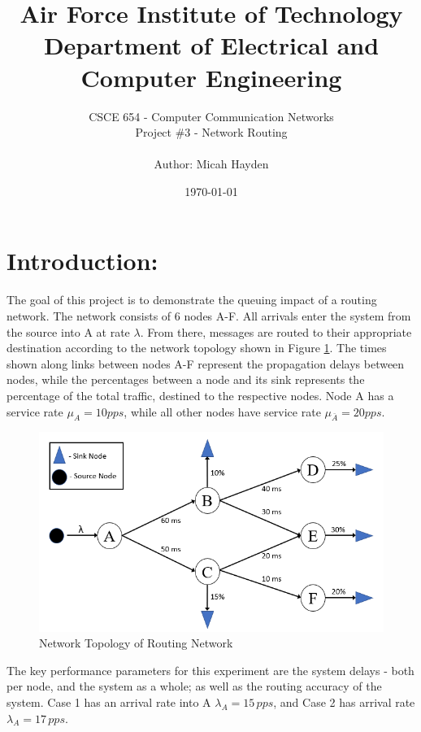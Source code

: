 \documentclass{article}
\title{Air Force Institute of Technology \\ Department of Electrical and Computer Engineering}
\author{CSCE 654 - Computer Communication Networks \\ Project \#3 - Network Routing \\ \\ Author:  Micah Hayden }
\date{\today}
\begin{document}
\maketitle

\section{Introduction:}
\label{sec:Intro}

The goal of this project is to demonstrate the queuing impact of a routing network.
The network consists of 6 nodes A-F. 
All arrivals enter the system from the source into A at rate $\lambda$.
From there, messages are routed to their appropriate destination according to the network topology shown in Figure \ref{fig:Topology}.
The times shown along links between nodes A-F represent the propagation delays between nodes, while the percentages between a node and its sink represents the percentage of the total traffic, destined to the respective nodes. 
Node A has a service rate $\mu_A = 10 pps$, while all other nodes have service rate $\mu_{\bar{A}} = 20 pps$.

\begin{figure}[h!]
\centering
\includegraphics[scale=0.75]{Images/NetworkTopology.PNG}
\caption{Network Topology of Routing Network}
\label{fig:Topology}
\end{figure}

The key performance parameters for this experiment are the system delays - both per node, and the system as a whole; as well as the routing accuracy of the system.
Case 1 has an arrival rate into A $\lambda_A = 15 \, pps$, and Case 2 has arrival rate $\lambda_A = 17 \, pps$.
\end{document}
